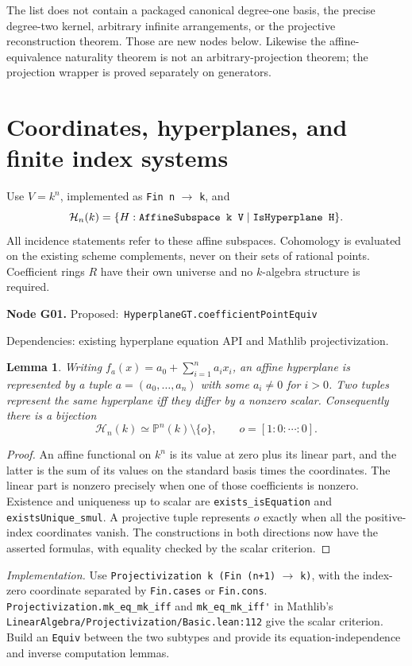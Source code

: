 \documentclass[11pt]{article}
\newtheorem{lemma}[theorem]{Lemma}
\theoremstyle{remark}\newtheorem{remark}[theorem]{Remark}
\newcommand{\Pj}{\mathbb P}
\newcommand{\cH}{\mathcal H}
\newcommand{\code}[1]{\nolinkurl{#1}}
\newcommand{\node}[3]{\par\Needspace{8\baselineskip}\smallskip\noindent\textbf{Node #1.}\quad
 \textsf{Proposed:}\ \code{#2}\par\noindent
 \textsf{Dependencies:} #3.\par\smallskip}
\begin{document}
The list does not contain a packaged canonical degree-one basis, the
precise degree-two kernel, arbitrary infinite arrangements, or the
projective reconstruction theorem. Those are new nodes below. Likewise
the affine-equivalence naturality theorem is not an arbitrary-projection
theorem; the projection wrapper is proved separately on generators.

\section{Coordinates, hyperplanes, and finite index systems}
\label{sec:geometry}

Use $V=k^n$, implemented as \texttt{Fin n} $\to$ \texttt{k}, and
\[
 \cH_n(k)=\{H:\text{\texttt{AffineSubspace k V}}\mid\text{\texttt{IsHyperplane H}}\}.
\]
All incidence statements refer to these affine subspaces. Cohomology
is evaluated on the existing scheme complements, never on their sets
of rational points. Coefficient rings $R$ have their own universe and
no $k$-algebra structure is required.

\node{G01}{HyperplaneGT.coefficientPointEquiv}{existing hyperplane equation API and Mathlib projectivization}
\begin{lemma}\label{lem:g01}
Writing $f_a(x)=a_0+\sum_{i=1}^na_ix_i$, an affine hyperplane is
represented by a tuple $a=(a_0,\ldots,a_n)$ with some $a_i\ne0$ for
$i>0$. Two tuples represent the same hyperplane iff they differ by a
nonzero scalar. Consequently there is a bijection
\[
 \cH_n(k)\simeq\Pj^n(k)\setminus\{o\},\qquad o=[1:0:\cdots:0].
\]
\end{lemma}
\begin{proof}
An affine functional on $k^n$ is its value at zero plus its linear
part, and the latter is the sum of its values on the standard basis
times the coordinates. The linear part is nonzero precisely when one
of those coefficients is nonzero. Existence and uniqueness up to
scalar are \code{exists_isEquation} and \code{existsUnique_smul}.
A projective tuple represents $o$ exactly when all the positive-index
coordinates vanish. The constructions in both directions now have
the asserted formulas, with equality checked by the scalar criterion.
\end{proof}
\emph{Implementation.} Use
\texttt{Projectivization k (Fin (n+1)} $\to$ \texttt{k)}, with the index-zero
coordinate separated by \code{Fin.cases} or \code{Fin.cons}.
\code{Projectivization.mk_eq_mk_iff} and
\code{mk_eq_mk_iff'} in Mathlib's
\code{LinearAlgebra/Projectivization/Basic.lean:112} give the scalar
criterion. Build an \code{Equiv} between the two subtypes and provide
its equation-independence and inverse computation lemmas.
\end{document}
